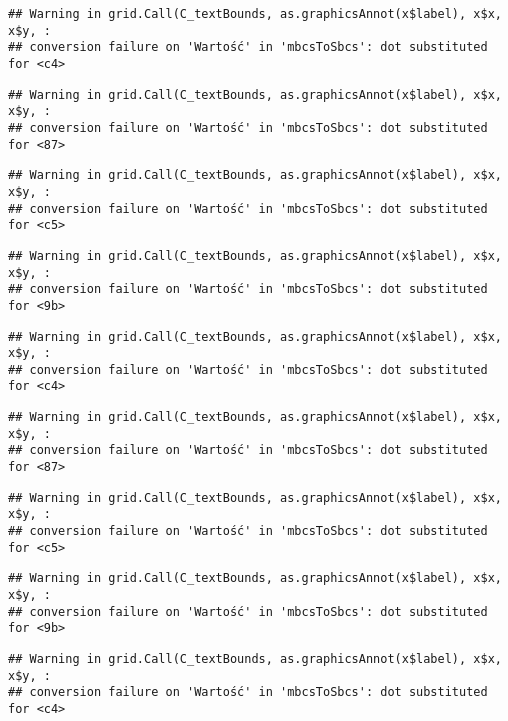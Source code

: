 \documentclass[
]{book}
\begin{document}
\begin{verbatim}
## Warning in grid.Call(C_textBounds, as.graphicsAnnot(x$label), x$x, x$y, :
## conversion failure on 'Wartość' in 'mbcsToSbcs': dot substituted for <c4>
\end{verbatim}

\begin{verbatim}
## Warning in grid.Call(C_textBounds, as.graphicsAnnot(x$label), x$x, x$y, :
## conversion failure on 'Wartość' in 'mbcsToSbcs': dot substituted for <87>
\end{verbatim}

\begin{verbatim}
## Warning in grid.Call(C_textBounds, as.graphicsAnnot(x$label), x$x, x$y, :
## conversion failure on 'Wartość' in 'mbcsToSbcs': dot substituted for <c5>
\end{verbatim}

\begin{verbatim}
## Warning in grid.Call(C_textBounds, as.graphicsAnnot(x$label), x$x, x$y, :
## conversion failure on 'Wartość' in 'mbcsToSbcs': dot substituted for <9b>
\end{verbatim}

\begin{verbatim}
## Warning in grid.Call(C_textBounds, as.graphicsAnnot(x$label), x$x, x$y, :
## conversion failure on 'Wartość' in 'mbcsToSbcs': dot substituted for <c4>
\end{verbatim}

\begin{verbatim}
## Warning in grid.Call(C_textBounds, as.graphicsAnnot(x$label), x$x, x$y, :
## conversion failure on 'Wartość' in 'mbcsToSbcs': dot substituted for <87>
\end{verbatim}

\begin{verbatim}
## Warning in grid.Call(C_textBounds, as.graphicsAnnot(x$label), x$x, x$y, :
## conversion failure on 'Wartość' in 'mbcsToSbcs': dot substituted for <c5>
\end{verbatim}

\begin{verbatim}
## Warning in grid.Call(C_textBounds, as.graphicsAnnot(x$label), x$x, x$y, :
## conversion failure on 'Wartość' in 'mbcsToSbcs': dot substituted for <9b>
\end{verbatim}

\begin{verbatim}
## Warning in grid.Call(C_textBounds, as.graphicsAnnot(x$label), x$x, x$y, :
## conversion failure on 'Wartość' in 'mbcsToSbcs': dot substituted for <c4>
\end{verbatim}
\end{document}
